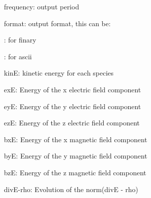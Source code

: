 \begin{DoxyItemize}
\item {\ttfamily frequency}\+: output period
\item {\ttfamily format}\+: output format, this can be\+:
\begin{DoxyItemize}
\item {}\+: for finary
\item {}\+: for ascii
\end{DoxyItemize}
\item {\ttfamily kinE}\+: kinetic energy for each species
\item {\ttfamily exE}\+: Energy of the x electric field component
\item {\ttfamily eyE}\+: Energy of the y electric field component
\item {\ttfamily ezE}\+: Energy of the z electric field component
\item {\ttfamily bxE}\+: Energy of the x magnetic field component
\item {\ttfamily byE}\+: Energy of the y magnetic field component
\item {\ttfamily bzE}\+: Energy of the z magnetic field component
\item {\ttfamily div\+E-\/rho}\+: Evolution of the norm(divE -\/ rho) 
\end{DoxyItemize}